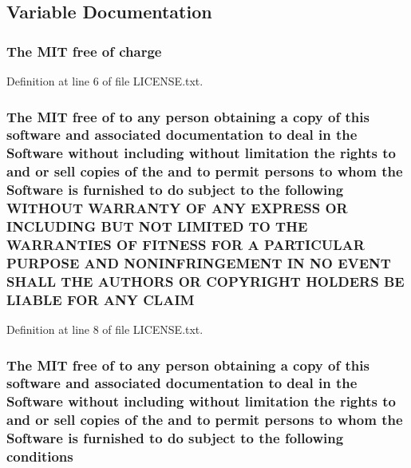 \subsection{Variable Documentation}
\subsubsection[{\texorpdfstring{charge}{charge}}]{\setlength{\rightskip}{0pt plus 5cm}The M\+IT free of charge}\hypertarget{LICENSE_8txt_aebc511ed3f15c16125b74aa0f22cfa10}{}\label{LICENSE_8txt_aebc511ed3f15c16125b74aa0f22cfa10}


Definition at line 6 of file L\+I\+C\+E\+N\+S\+E.\+txt.

\subsubsection[{\texorpdfstring{C\+L\+A\+IM}{CLAIM}}]{\setlength{\rightskip}{0pt plus 5cm}The M\+IT free of to any person obtaining a {\bf copy} of this software and associated documentation to deal in the {\bf Software} without including without limitation the rights to and or sell copies of the and to permit persons to whom the {\bf Software} is furnished to do subject to the following W\+I\+T\+H\+O\+UT W\+A\+R\+R\+A\+N\+TY OF A\+NY E\+X\+P\+R\+E\+SS OR I\+N\+C\+L\+U\+D\+I\+NG B\+UT N\+OT L\+I\+M\+I\+T\+ED TO T\+HE W\+A\+R\+R\+A\+N\+T\+I\+ES OF F\+I\+T\+N\+E\+SS F\+OR A P\+A\+R\+T\+I\+C\+U\+L\+AR P\+U\+R\+P\+O\+SE A\+ND N\+O\+N\+I\+N\+F\+R\+I\+N\+G\+E\+M\+E\+NT IN NO E\+V\+E\+NT S\+H\+A\+LL T\+HE A\+U\+T\+H\+O\+RS OR C\+O\+P\+Y\+R\+I\+G\+HT H\+O\+L\+D\+E\+RS BE L\+I\+A\+B\+LE F\+OR A\+NY C\+L\+A\+IM}\hypertarget{LICENSE_8txt_a6748037be7bf72df72169eafdc8c492e}{}\label{LICENSE_8txt_a6748037be7bf72df72169eafdc8c492e}


Definition at line 8 of file L\+I\+C\+E\+N\+S\+E.\+txt.

\subsubsection[{\texorpdfstring{conditions}{conditions}}]{\setlength{\rightskip}{0pt plus 5cm}The M\+IT free of to any person obtaining a {\bf copy} of this software and associated documentation to deal in the {\bf Software} without including without limitation the rights to and or sell copies of the and to permit persons to whom the {\bf Software} is furnished to do subject to the following conditions}\hypertarget{LICENSE_8txt_a9519688b6bdbbccdcec5fef05966b25b}{}\label{LICENSE_8txt_a9519688b6bdbbccdcec5fef05966b25b}


